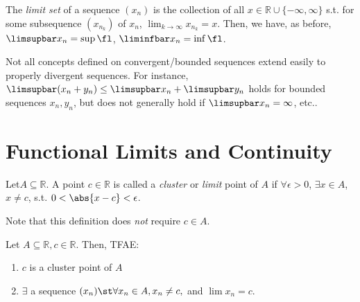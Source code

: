 \documentclass[12pt]{article}
\begin{document}

\begin{definition}
  The \textit{limit set} of a sequence $(x_n)$ is the collection of all $x \in \mathbb{R} \cup \{- \infty, \infty\}$ s.t. for some subsequence $(x_{n_k})$ of $x_n$, $\lim_{k\to\infty} x_{n_k} = x$. Then, we have, as before, $\limsupbar x_n = \sup \fl$, $\liminfbar x_n = \inf \fl$.
\end{definition}

\begin{remark}
  Not all concepts defined on convergent/bounded sequences extend easily to properly divergent sequences. For instance, $\limsupbar (x_n + y_n) \leq \limsupbar x_n + \limsupbar y_n$ holds for bounded sequences $x_n, y_n$, but does not generally hold if $\limsupbar x_n = \infty$, etc..
\end{remark}

\section{Functional Limits and Continuity}

\begin{definition}
  Let\footnotemark $A \subseteq \mathbb{R}$. A point $c \in \mathbb{R}$ is called a \emph{cluster} or \emph{limit} point of $A$ if $\forall \epsilon > 0$, $\exists x \in A$, $x \neq c$, s.t. $0 < \abs{x-c} < \epsilon$.
\end{definition}

\begin{remark}
  Note that this definition does \emph{not} require $c \in A$.
\end{remark}

\begin{proposition}
  Let $A \subseteq \mathbb{R}, c \in \mathbb{R}$. Then, TFAE:
  \begin{enumerate}
    \item $c$ is a cluster point of $A$
    \item $\exists$ a sequence $(x_n) \st \forall x_n \in A, x_n \neq c,$ and $\lim x_{n} = c$.
  \end{enumerate}
\end{proposition}
\end{document}
